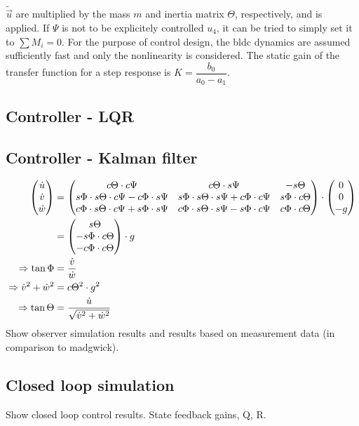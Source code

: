 $\tilde{\vec{u}}$ are multiplied by the mass $m$ and inertia matrix $\Theta$, respectively, and  is applied. If $\Psi$ is not to be explicitely controlled $u_4$, it can be tried to simply set it to $\sum M_i = 0$.
For the purpose of control design, the bldc dynamics are assumed sufficiently fast and only the nonlinearity is considered. The static gain of the transfer function for a step response is $K = \dfrac{b_0}{a_0 - a_1}$.
\clearpage

\subsection{Controller - LQR}

\clearpage

\subsection{Controller - Kalman filter}
\begin{align*}
	\begin{pmatrix} 
		\dot{u} \\
		\dot{v} \\
		\dot{w} 
	\end{pmatrix} &= \begin{pmatrix}
		c{\Theta} \cdot c{\Psi} & c{\Theta} \cdot s{\Psi} & - s{\Theta}
		\\
		s{\Phi}\cdot s{\Theta} \cdot c{\Psi} - c{\Phi} \cdot s{\Psi} & s{\Phi} \cdot s{\Theta} \cdot s{\Psi} + c{\Phi} \cdot c{\Psi} & s{\Phi} \cdot c{\Theta}
		\\
		c{\Phi} \cdot s{\Theta} \cdot c{\Psi} +s{\Phi} \cdot s{\Psi} & c{\Phi} \cdot s{\Theta} \cdot s{\Psi} - s{\Phi} \cdot c{\Psi} & c{\Phi} \cdot c{\Theta}
	\end{pmatrix} \cdot \begin{pmatrix}
		0 \\
		0 \\
		-g 
	\end{pmatrix}
	\\
	&= \begin{pmatrix}
		s{\Theta} \\
		-s{\Phi} \cdot c{\Theta} \\
		-c{\Phi} \cdot c{\Theta} 
	\end{pmatrix} \cdot g
	\\
	\Rightarrow \tan{\Phi} &= \dfrac{\dot{v}}{\dot{w}}
	\\
	\Rightarrow \dot{v}^2 + \dot{w}^2 &= c{\Theta}^2 \cdot g^2
	\\
	\Rightarrow \tan{\Theta} &= \dfrac{\dot{u}}{\sqrt{\dot{v}^2+\dot{w}^2}}
\end{align*}
Show observer simulation results and results based on measurement data (in comparison to madgwick).
\clearpage

\subsection{Closed loop simulation}
 Show closed loop control results. State feedback gains, Q, R. 